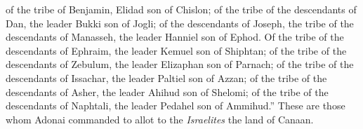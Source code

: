 \begin{biblechapter}
\verse of the tribe of Benjamin, Elidad son of Chislon;
\verse of the tribe of the descendants of Dan, the leader Bukki son of Jogli;
\verse of the descendants of Joseph, the tribe of the descendants of Manasseh, the leader Hanniel son of Ephod.
\verse Of the tribe of the descendants of Ephraim, the leader Kemuel son of Shiphtan;
\verse of the tribe of the descendants of Zebulum, the leader Elizaphan son of Parnach;
\verse of the tribe of the descendants of Issachar, the leader Paltiel son of Azzan;
\verse of the tribe of the descendants of Asher, the leader Ahihud son of Shelomi;
\verse of the tribe of the descendants of Naphtali, the leader Pedahel son of Ammihud.”
\verse These are those whom Adonai commanded to allot to the \textit{Israelites} the land of Canaan.
\end{biblechapter}

